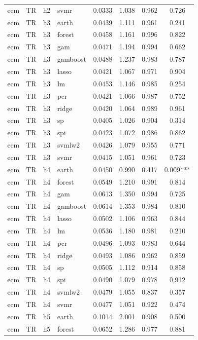 \begin{ThreePartTable}
\begin{longtable}[t]{llclcccc}
ecm & TR & h2 & svmr & 0.0333 & 1.038 & 0.962 & 0.726\\
\addlinespace
ecm & TR & h3 & earth & 0.0439 & 1.111 & 0.961 & 0.241\\
ecm & TR & h3 & forest & 0.0458 & 1.161 & 0.996 & 0.822\\
ecm & TR & h3 & gam & 0.0471 & 1.194 & 0.994 & 0.662\\
ecm & TR & h3 & gamboost & 0.0488 & 1.237 & 0.983 & 0.787\\
ecm & TR & h3 & lasso & 0.0421 & 1.067 & 0.971 & 0.904\\
ecm & TR & h3 & lm & 0.0453 & 1.146 & 0.985 & 0.254\\
ecm & TR & h3 & pcr & 0.0421 & 1.066 & 0.987 & 0.752\\
ecm & TR & h3 & ridge & 0.0420 & 1.064 & 0.989 & 0.961\\
ecm & TR & h3 & sp & 0.0405 & 1.026 & 0.904 & 0.314\\
ecm & TR & h3 & spi & 0.0423 & 1.072 & 0.986 & 0.862\\
ecm & TR & h3 & svmlw2 & 0.0426 & 1.079 & 0.955 & 0.771\\
ecm & TR & h3 & svmr & 0.0415 & 1.051 & 0.961 & 0.723\\
\addlinespace
ecm & TR & h4 & earth & 0.0450 & 0.990 & 0.417 & 0.009***\\
ecm & TR & h4 & forest & 0.0549 & 1.210 & 0.991 & 0.814\\
ecm & TR & h4 & gam & 0.0613 & 1.350 & 0.994 & 0.725\\
ecm & TR & h4 & gamboost & 0.0614 & 1.353 & 0.984 & 0.810\\
ecm & TR & h4 & lasso & 0.0502 & 1.106 & 0.963 & 0.844\\
ecm & TR & h4 & lm & 0.0536 & 1.180 & 0.981 & 0.210\\
ecm & TR & h4 & pcr & 0.0496 & 1.093 & 0.983 & 0.644\\
ecm & TR & h4 & ridge & 0.0493 & 1.086 & 0.962 & 0.859\\
ecm & TR & h4 & sp & 0.0505 & 1.112 & 0.914 & 0.858\\
ecm & TR & h4 & spi & 0.0490 & 1.079 & 0.978 & 0.912\\
ecm & TR & h4 & svmlw2 & 0.0479 & 1.055 & 0.837 & 0.357\\
ecm & TR & h4 & svmr & 0.0477 & 1.051 & 0.922 & 0.474\\
\addlinespace
ecm & TR & h5 & earth & 0.1014 & 2.001 & 0.908 & 0.500\\
ecm & TR & h5 & forest & 0.0652 & 1.286 & 0.977 & 0.881\\

\end{longtable}
\end{ThreePartTable}
